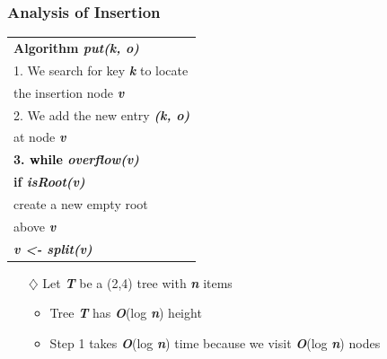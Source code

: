 \documentclass[pdf,
serif,
compress,
xcolor=table,
dvipsnames,
spanish,
aspectratio=169]{beamer}
\begin{document}
\begin{frame}
    \frametitle{Analysis of Insertion}
    
    \begin{minipage}{0.5\linewidth}
        \begin{tabular}{|l|}
            \hline    
            \textbf{Algorithm \textit{\textcolor{naranja}{put(k, o)}}}\\
            \textcolor{purpura}{1. We search for key \textit{\textbf{k}} to locate}\\
            \hspace{0.4cm}\textcolor{purpura}{the insertion node \textit{\textbf{v}}}\\
            \textcolor{purpura}{2. We add the new entry \textit{\textbf{(k, o)}}}\\
            \hspace{0.4cm}\textcolor{purpura}{at node \textit{\textbf{v}}}\\
            \textbf{\textcolor{purpura}{3. \textcolor{black}{while} \textit{overflow(v)}}}\\
            \hspace{0.45cm}\textbf{if \textcolor{purpura}{\textit{isRoot(v)}}}\\
            \hspace{0.8cm}\textcolor{purpura}{create a new empty root} \\
            \hspace{0.8cm}\textcolor{purpura}{above \textbf{\textit{v}}} \\
            \hspace{0.44cm} \textcolor{purpura}{\textbf{\textit{v <- split(v)}}}\\
            \hline
        \end{tabular}
    \end{minipage}%
    \begin{minipage}{0.5\linewidth}
        \begin{itemize} \color{purpura}
            \item[\(\diamondsuit\)] Let \textit{\textbf{T}} be a (2,4) tree with \textbf{\textit{n}} items
            \begin{itemize} \color{purpura}
                \item Tree \textbf{\textit{T}} has \textit{\textbf{O}}(log \textbf{\textit{n}}) height 
                \item Step 1 takes \textbf{\textit{O}}(log \textbf{\textit{n}}) time because we visit \textbf{\textit{O}}(log \textbf{\textit{n}}) nodes

\end{itemize}
\end{itemize}
\end{minipage}
\end{frame}
\end{document}
